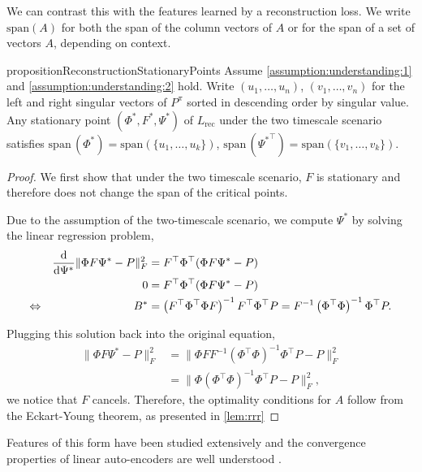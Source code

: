 We can contrast this with the features learned by a reconstruction loss.
We write $\mathrm{span}(A)$ for both the span of the column vectors of $A$ or for the span of a set of vectors $A$, depending on context.
\begin{restatable}{proposition}{ReconstructionStationaryPoints}\label{prop:understanding:2}
Assume \autoref{assumption:understanding:1} and \autoref{assumption:understanding:2} hold. Write $(u_1,\dots,u_n)$, $(v_1,\dots,v_n)$ for the left and right singular vectors of $P^\pi$ sorted in descending order by singular value. Any stationary point $(\Phi^*, F^*, \Psi^*)$ of $L_\text{rec}$ under the two timescale scenario satisfies $\mathrm{span}\,(\Phi^*)=\mathrm{span}\left(\{u_1,\dots,u_k\}\right)$, $\mathrm{span}\,({\Psi^*}^\top)=\mathrm{span}\left(\{v_1,\dots,v_k\}\right)$.
\end{restatable}
\begin{proof}
We first show that under the two timescale scenario, $F$ is stationary and therefore does not change the span of the critical points.

Due to the assumption of the two-timescale scenario, we compute $\Psi^*$ by solving the linear regression problem,
\begin{align*}
    &&\frac{\mathrm{d}}{\mathrm{d} \Psi^*} \lVert \Phi F\Psi^* - P \rVert_F^2 &= F^\top {\Phi}^\top ({\Phi}F\Psi^* - P)\\
    &&0 &=  F^\top {\Phi}^\top ({\Phi}F\Psi^* - P)\\
    \Leftrightarrow && B^* &= \left(F^\top {\Phi}^\top {\Phi}F\right)^{-1} F^\top \Phi^\top P = F^{-1}\left(\Phi^\top \Phi\right)^{-1} \Phi^\top P.
\end{align*}

Plugging this solution back into the original equation, 
\begin{align}
    \lVert \Phi F\Psi^* - P \rVert_F^2 &= \lVert \Phi FF^{-1}\left(\Phi^\top \Phi\right)^{-1} \Phi^\top P - P \rVert_F^2\\
    &= \lVert \Phi \left(\Phi^\top \Phi\right)^{-1} \Phi^\top P - P \rVert_F^2,
\end{align}
we notice that $F$ cancels.
Therefore, the optimality conditions for $A$ follow from the Eckart-Young theorem, as presented in \autoref{lem:rrr}
\end{proof}


Features of this form have been studied extensively and the convergence properties of linear auto-encoders are well understood \parencite{baldi1989neural,pretorius2018learning,bao2020regularized}.

